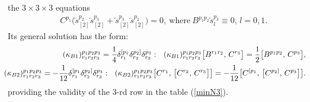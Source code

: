 \documentclass[10pt]{article}
\begin{document}
the $3\times3\times 3$ equations
\begin{eqnarray}\label{consistC}
  && C^{p_1}\big(\overleftarrow{s}{}^{p_2}_{[2]}\overleftarrow{s}{}^{p_3}_{[2]}+\overleftarrow{s}{}^{p_3}_{[2]}\overleftarrow{s}{}^{p_2}_{[2]}\big) =0, \ \mathrm{where}  \ B^{p_1p_2}\overleftarrow{s}{}^{p_3}_{l}\equiv 0,\, l=0,1.
\end{eqnarray}
Its general  solution has the form:
\begin{eqnarray}\label{solconstC}
\hspace{-0.5em}  &\hspace{-0.5em}&\hspace{-0.5em} (\kappa_{B1})^{p_1p_2p_3}_{r_1r_2r_3} = \frac{1}{4} \delta^{[p_1}_{r_1}\delta^{p_2]}_{r_2} \delta^{p_3}_{{r_3}}:\  \ (\kappa_{B1})^{p_1p_2p_3}_{r_1r_2r_3} \big[B^{r_1r_2},\,C^{r_3}\big] = \frac{1}{2} \big[B^{p_1p_2},\,C^{p_3}\big], \\
  \hspace{-0.5em}  &\hspace{-0.5em}&\hspace{-0.5em}  (\kappa_{B2})^{p_1p_2p_3}_{r_1r_2r_3} = -\frac{1}{12} \delta^{[p_1}_{r_1}\delta^{p_2]}_{r_2} \delta^{p_3}_{r_3}:\ \    (\kappa_{B2})^{p_1p_2p_3}_{r_1r_2r_3}  \big[C^{r_1},\,\big[C^{r_2},\,C^{r_3}\big]\big] = - \frac{1}{12} \big[C^{[p_1},\,\big[C^{p_2]},\,C^{p_3}\big]\big].
\end{eqnarray}
providing the validity of the $3$-rd row in the table (\ref{minN3}).
\end{document}
